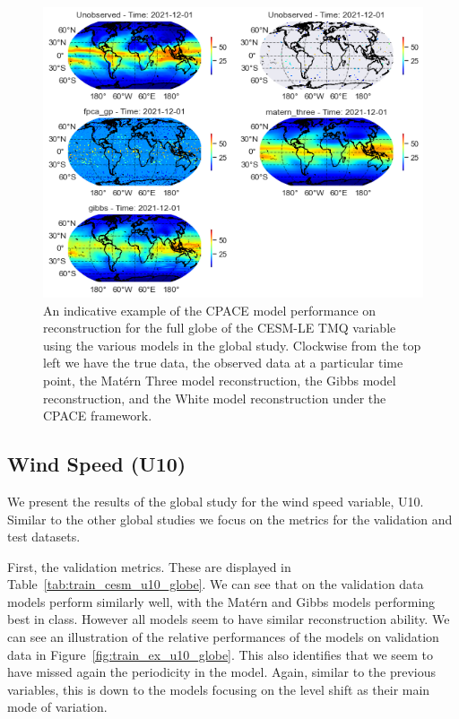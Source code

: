 \begin{figure}
	\centering
	\includegraphics[width=\textwidth]{full_ex_tmq_globe}
	\caption[An indicative example of the CPACE model performance on reconstruction for the full globe of the CESM-LE TMQ variable using the various models in the global study.]{An indicative example of the CPACE model performance on reconstruction for the full globe of the CESM-LE TMQ variable using the various models in the global study. Clockwise from the top left we have the true data, the observed data at a particular time point, the Mat\'ern Three model reconstruction, the Gibbs model reconstruction, and the White model reconstruction under the CPACE framework.}
	\label{fig:full_ex_tmq_globe}
\end{figure}


\subsection{Wind Speed (U10)\label{ssec:cesm_u10}}
We present the results of the global study for the wind speed variable, U10.
Similar to the other global studies we focus on the metrics for the validation and test datasets.

First, the validation metrics.
These are displayed in Table~\ref{tab:train_cesm_u10_globe}.
We can see that on the validation data models perform similarly well, with the Mat\'ern and Gibbs models performing best in class.
However all models seem to have similar reconstruction ability.
We can see an illustration of the relative performances of the models on validation data in Figure~\ref{fig:train_ex_u10_globe}.
This also identifies that we seem to have missed again the periodicity in the model.
Again, similar to the previous variables, this is down to the models focusing on the level shift as their main mode of variation.

